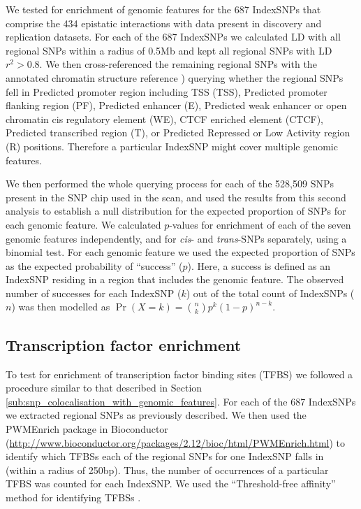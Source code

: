 \documentclass{article}
\begin{document}
We tested for enrichment of genomic features for the 687 IndexSNPs that comprise the 434 epistatic interactions with data present in discovery and replication datasets. For each of the 687 IndexSNPs we calculated LD with all regional SNPs within a radius of 0.5Mb and kept all regional SNPs with LD $r^{2} > 0.8$. We then cross-referenced the remaining regional SNPs with the annotated chromatin structure reference \cite{Hoffman2012}) querying whether the regional SNPs fell in Predicted promoter region including TSS (TSS), Predicted promoter flanking region (PF), Predicted enhancer (E), Predicted weak enhancer or open chromatin cis regulatory element (WE), CTCF enriched element (CTCF), Predicted transcribed region (T), or Predicted Repressed or Low Activity region (R) positions. Therefore a particular IndexSNP might cover multiple genomic features.

We then performed the whole querying process for each of the 528,509 SNPs present in the SNP chip used in the scan, and used the results from this second analysis to establish a null distribution for the expected proportion of SNPs for each genomic feature. We calculated $p$-values for enrichment of each of the seven genomic features independently, and for \emph{cis}- and \emph{trans}-SNPs separately, using a binomial test. For each genomic feature we used the expected proportion of SNPs as the expected probability of ``success'' ($p$). Here, a success is defined as an IndexSNP residing in a region that includes the genomic feature. The observed number of successes for each IndexSNP ($k$) out of the total count of IndexSNPs ($n$) was then modelled as $\Pr (X = k) = {n \choose k} p^{k}(1-p)^{n-k}$.



\subsection{Transcription factor enrichment}

To test for enrichment of transcription factor binding sites (TFBS) we followed a procedure similar to that described in Section \ref{sub:snp_colocalisation_with_genomic_features}. For each of the 687 IndexSNPs we extracted regional SNPs as previously described. We then used the PWMEnrich package in Bioconductor (\url{http://www.bioconductor.org/packages/2.12/bioc/html/PWMEnrich.html}) to identify which TFBSs each of the regional SNPs for one IndexSNP falls in (within a radius of 250bp). Thus, the number of occurrences of a particular TFBS was counted for each IndexSNP. We used the ``Threshold-free affinity'' method for identifying TFBSs \cite{Stormo2000}.
\end{document}
